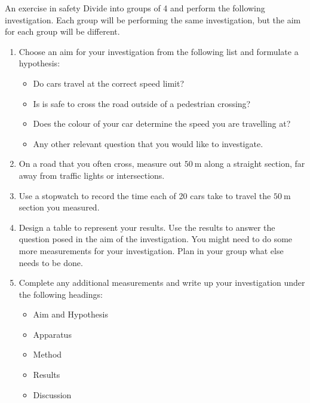 \begin{Investigation}{An exercise in safety }
            \nopagebreak
        \label{m38791*id67213}Divide into groups of 4 and perform the following investigation. Each group will be performing the same investigation, but the aim for each group will be different.\par 
        \label{m38791*id67220}\begin{enumerate}[noitemsep, label=\textbf{\arabic*}. ] 
            \label{m38791*uid57}\item Choose an aim for your investigation from the following list and formulate a hypothesis:
\label{m38791*id67236}\begin{itemize}[noitemsep]
            \label{m38791*uid58}\item Do cars travel at the correct speed limit?
\label{m38791*uid59}\item Is is safe to cross the road outside of a pedestrian crossing?
\label{m38791*uid60}\item Does the colour of your car determine the speed you are travelling at?
\label{m38791*uid61}\item Any other relevant question that you would like to investigate.
\end{itemize}
        \label{m38791*uid62}\item On a road that you often cross, measure out $50~\text{m}$ along a straight section, far away from traffic lights or intersections.
\label{m38791*uid63}\item Use a stopwatch to record the time each of 20 cars take to travel the $50~\text{m}$ section you measured.
\label{m38791*uid64}\item Design a table to represent your results. Use the results to answer the question posed in the aim of the investigation. You might need to do some more measurements for your investigation. Plan in your group what else needs to be done.
\label{m38791*uid65}\item Complete any additional measurements and write up your investigation under the following headings:
\label{m38791*id67343}\begin{itemize}[noitemsep]
            \label{m38791*uid66}\item Aim and Hypothesis
\label{m38791*uid67}\item Apparatus
\label{m38791*uid68}\item Method
\label{m38791*uid69}\item Results
\label{m38791*uid70}\item Discussion

\end{itemize}
\end{enumerate}
\end{Investigation}

